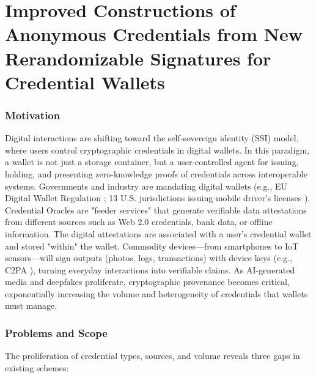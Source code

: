 \chapter{Improved Constructions of Anonymous Credentials from New Rerandomizable Signatures for Credential Wallets}\label{chap2}


\subsection{Motivation}

Digital interactions are shifting toward the self‑sovereign identity (SSI) model, where users control cryptographic credentials in digital wallets. In this paradigm, a wallet is not just a storage container, but a user-controlled agent for issuing, holding, and presenting zero-knowledge proofs of credentials across interoperable systems. Governments and industry are mandating digital wallets (e.g., EU Digital Wallet Regulation \cite{noauthor_regulation_2024}; 13 U.S. jurisdictions issuing mobile driver’s licenses \cite{aamva_jurisdiction_nodate}). Credential Oracles \cite{zhang_deco_2020, celi_distefano_2025} are "feeder services" that generate verifiable data attestations from different sources such as Web 2.0 credentials, bank data, or offline information.  The digital attestations are associated with a user's credential wallet and stored "within" the wallet. Commodity devices—from smartphones to IoT sensors—will sign outputs (photos, logs, transactions) with device keys (e.g., C2PA \cite{c2paorg_content_2024}), turning everyday interactions into verifiable claims. As AI-generated media and deepfakes proliferate, cryptographic provenance becomes critical, exponentially increasing the volume and heterogeneity of credentials that wallets must manage.



\subsection{Problems and Scope}

The proliferation of credential types, sources, and volume reveals three gaps in existing schemes:

